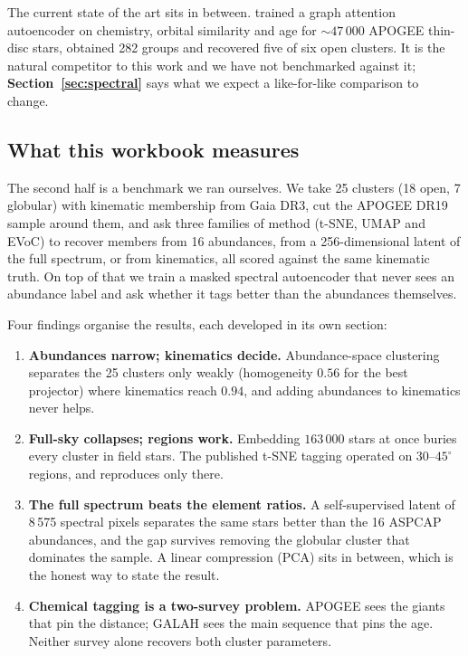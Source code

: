 The current state of the art sits in between. \citet{Spina:25} trained a graph
attention autoencoder on chemistry, orbital similarity and age for
$\sim\!47\,000$ APOGEE thin-disc stars, obtained 282 groups and recovered five
of six open clusters. It is the natural competitor to this work and we have
not benchmarked against it; \textbf{Section~\ref{sec:spectral}} says what we
expect a like-for-like comparison to change.

\begin{marginnote}[]  
\end{marginnote}

\subsection{What this workbook measures}

The second half is a benchmark we ran ourselves. We take 25 clusters (18 open,
7 globular) with kinematic membership from Gaia DR3, cut the APOGEE DR19 sample
around them, and ask three families of method (t-SNE, UMAP and EVoC) to recover
members from 16 abundances, from a 256-dimensional latent of the full spectrum,
or from kinematics, all scored against the same kinematic truth. On top of that
we train a masked spectral autoencoder that never sees an abundance label and
ask whether it tags better than the abundances themselves.

Four findings organise the results, each developed in its own section:

\begin{enumerate}
\item \textbf{Abundances narrow; kinematics decide.} Abundance-space
  clustering separates the 25 clusters only weakly (homogeneity $0.56$ for the
  best projector) where kinematics reach $0.94$, and adding abundances to
  kinematics never helps.
\item \textbf{Full-sky collapses; regions work.} Embedding $163\,000$ stars at
  once buries every cluster in field stars. The published t-SNE tagging
  operated on $30$--$45^\circ$ regions, and reproduces only there.
\item \textbf{The full spectrum beats the element ratios.} A self-supervised
latent of 8\,575 spectral pixels separates the same stars better than the 16
ASPCAP abundances, and the gap survives removing the globular cluster that
dominates the sample. A linear compression (PCA) sits in between, which is the
honest way to state the result.
\item \textbf{Chemical tagging is a two-survey problem.} APOGEE sees the
  giants that pin the distance; GALAH sees the main sequence that pins the
  age. Neither survey alone recovers both cluster parameters.
\end{enumerate}

